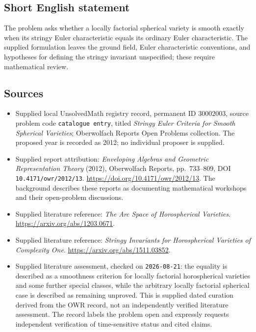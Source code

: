 \documentclass[11pt]{article}
\begin{document}
\subsection{Short English statement}
The problem asks whether a locally factorial spherical variety is smooth exactly when its stringy Euler characteristic equals its ordinary Euler characteristic. The supplied formulation leaves the ground field, Euler characteristic conventions, and hypotheses for defining the stringy invariant unspecified; these require mathematical review.
\subsection{Sources}
\begin{itemize}
\item Supplied local UnsolvedMath registry record, permanent ID \(30002003\), source problem code \texttt{catalogue entry}, titled \emph{Stringy Euler Criteria for Smooth Spherical Varieties}; Oberwolfach Reports Open Problems collection. The proposed year is recorded as 2012; no individual proposer is supplied.
\item Supplied report attribution: \emph{Enveloping Algebras and Geometric Representation Theory} (2012), Oberwolfach Reports, pp.\ 733--809, DOI \texttt{10.4171/owr/2012/13}. \url{https://doi.org/10.4171/owr/2012/13}. The background describes these reports as documenting mathematical workshops and their open-problem discussions.
\item Supplied literature reference: \emph{The Arc Space of Horospherical Varieties}. \url{https://arxiv.org/abs/1203.0671}.
\item Supplied literature reference: \emph{Stringy Invariants for Horospherical Varieties of Complexity One}. \url{https://arxiv.org/abs/1511.03852}.
\item Supplied literature assessment, checked on \texttt{2026-08-21}: the equality is described as a smoothness criterion for locally factorial horospherical varieties and some further special classes, while the arbitrary locally factorial spherical case is described as remaining unproved. This is supplied dated curation derived from the OWR record, not an independently verified literature assessment. The record labels the problem open and expressly requests independent verification of time-sensitive status and cited claims.
\end{itemize}
\end{document}
